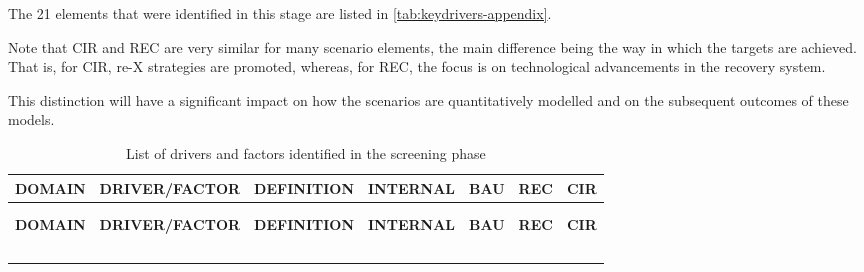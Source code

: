 \label{appendix:elements-3}


The 21 elements that were identified in this stage are listed in \autoref{tab:keydrivers-appendix}.


Note that CIR and REC are very similar for many scenario elements, the main difference being the way in which the targets are achieved. That is, for CIR, re-X strategies are promoted, whereas, for REC, the focus is on technological advancements in the recovery system. 


This distinction will have a significant impact on how the scenarios are quantitatively modelled and on the subsequent outcomes of these models.

\begin{landscape}
  \centering
  \small
  \begin{longtable}{|L{2.0cm}|L{5cm}|L{8cm}|L{2cm}|L{0.9cm}|L{0.9cm}|L{0.9cm}|}
    \caption{List of drivers and factors identified in the screening phase}\label{tab:keydrivers-appendix}                                                                                                                              \\
    \hline
    \color{white}\textbf{DOMAIN} & \color{white}\textbf{DRIVER/FACTOR} & \color{white}\textbf{DEFINITION} & \color{white}\textbf{INTERNAL} & \color{white}\textbf{BAU} & \color{white}\textbf{REC} & \color{white}\textbf{CIR} \\
    \hline
    \endfirsthead%
    \hline
                                                                                                                                                      \\
    \endfoot%
                                                                                                                    \\
    \hline
    \color{white}\textbf{DOMAIN} & \color{white}\textbf{DRIVER/FACTOR} & \color{white}\textbf{DEFINITION} & \color{white}\textbf{INTERNAL} & \color{white}\textbf{BAU} & \color{white}\textbf{REC} & \color{white}\textbf{CIR} \\
    \hline
    \endhead%
    \bottomrule
    \endlastfoot%
  \end{longtable}
\end{landscape}
